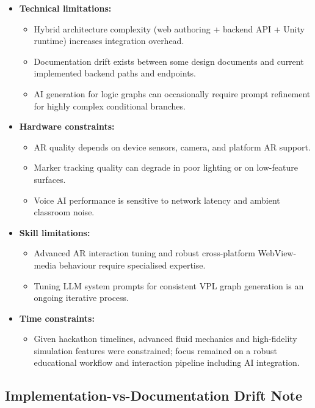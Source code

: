 \documentclass[12pt,a4paper]{article}
\begin{document}
\begin{itemize}[leftmargin=1.4cm]
  \item \textbf{Technical limitations:}
  \begin{itemize}
    \item Hybrid architecture complexity (web authoring + backend API + Unity runtime)
          increases integration overhead.
    \item Documentation drift exists between some design documents and current
          implemented backend paths and endpoints.
    \item AI generation for logic graphs can occasionally require prompt refinement for
          highly complex conditional branches.
  \end{itemize}
  \item \textbf{Hardware constraints:}
  \begin{itemize}
    \item AR quality depends on device sensors, camera, and platform AR support.
    \item Marker tracking quality can degrade in poor lighting or on low-feature surfaces.
    \item Voice AI performance is sensitive to network latency and ambient classroom noise.
  \end{itemize}
  \item \textbf{Skill limitations:}
  \begin{itemize}
    \item Advanced AR interaction tuning and robust cross-platform WebView-media behaviour
          require specialised expertise.
    \item Tuning LLM system prompts for consistent VPL graph generation is an ongoing
          iterative process.
  \end{itemize}
  \item \textbf{Time constraints:}
  \begin{itemize}
    \item Given hackathon timelines, advanced fluid mechanics and high-fidelity simulation
          features were constrained; focus remained on a robust educational workflow and
          interaction pipeline including AI integration.
  \end{itemize}
\end{itemize}

\subsection*{Implementation-vs-Documentation Drift Note}
\end{document}
